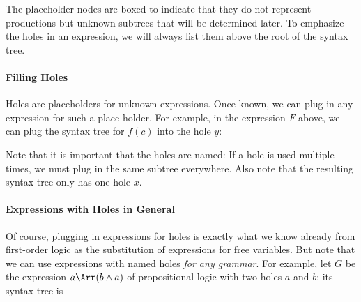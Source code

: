 \begin{center}
\end{center}

The placeholder nodes are boxed to indicate that they do not represent productions but unknown subtrees that will be determined later.
To emphasize the holes in an expression, we will always list them above the root of the syntax tree.

\paragraph{Filling Holes}
Holes are placeholders for unknown expressions. Once known, we can plug in any expression for such a place holder. For example, in the expression $F$ above, we can plug the syntax tree for $f(c)$ into the hole $y$:

\begin{center}
\end{center}

Note that it is important that the holes are named: If a hole is used multiple times, we must plug in the same subtree everywhere. Also note that the resulting syntax tree only has one hole $x$.
\medskip

\paragraph{Expressions with Holes in General}
Of course, plugging in expressions for holes is exactly what we know already from first-order logic as the substitution of expressions for free variables. But note that we can use expressions with named holes \emph{for any grammar}. For example, let $G$ be the expression $a \impl (b \wedge a)$ of propositional logic with two holes $a$ and $b$; its syntax tree is

